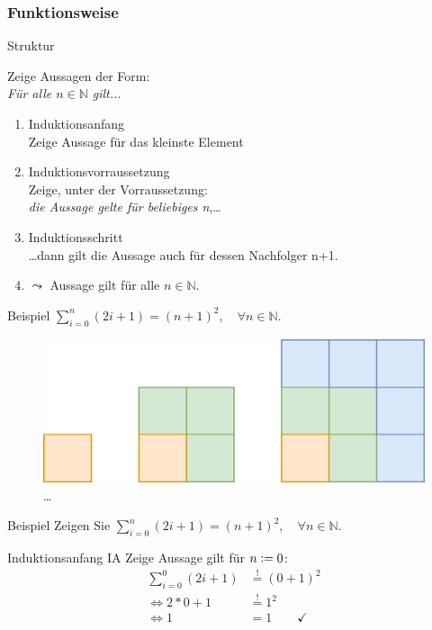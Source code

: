 \subsubsection{Funktionsweise}
\begin{frame}[fragile]{Struktur}
    \begin{alertblock}{Zeige Aussagen der Form:\\\emph{Für alle $n\in\mathbb{N}$ gilt...}}
    \begin{enumerate}
        \item \alert{Induktionsanfang}\\Zeige Aussage für das kleinste Element
        \item \alert{Induktionsvorraussetzung}\\Zeige, unter der Vorraussetzung: \\\emph{die Aussage gelte für beliebiges n},\dots
        \item \alert{Induktionsschritt}\\\dots dann gilt die Aussage auch für dessen Nachfolger n+1.
        \item $\leadsto$ Aussage gilt für alle $n \in \mathbb{N}$.
    \end{enumerate}
    \end{alertblock}
\end{frame}

\begin{frame}[fragile]{Beispiel}
\center $\displaystyle\sum_{i = 0}^{n} (2i+1) = (n+1)^2,\quad\forall n \in\mathbb{N}$.
    \begin{figure}
        \centering
        \includegraphics[width=0.5\textheight]{../figures/Summe.png}\qquad \dots
    \end{figure}
\end{frame}

\begin{frame}[fragile]{Beispiel}
Zeigen Sie $\displaystyle\sum_{i = 0}^{n} (2i+1) = (n+1)^2,\quad\forall n \in\mathbb{N}$.
\begin{alertblock}{Induktionsanfang IA}
    Zeige Aussage gilt für $n\vcentcolon=0$:\\
    \begin{align*}
        \sum_{i = 0}^{0} (2i+1) &\overset{!}{=} (0+1)^2\\
        \iff 2 * 0 + 1 &\overset{!}{=}1^2\\
        \iff 1 &= 1 \qquad\checkmark
    \end{align*}
\end{alertblock}
\end{frame}

